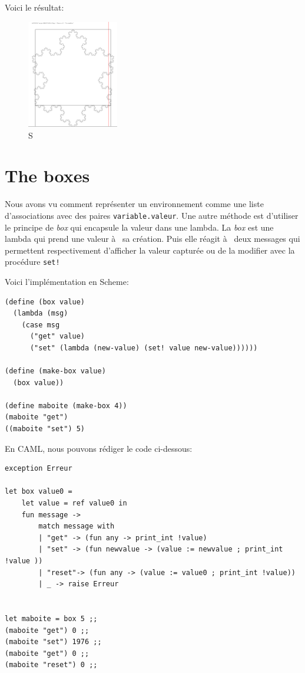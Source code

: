 \documentclass[11pt]{book}
\newcommand{\snow}{{\lettersnow S\hspace{0.2cm}}}
\begin{document}
Voici le résultat:
\begin{figure}[H]
	\centering
	\caption{\snow}
	\includegraphics[width=4.0cm]{snow.png}
\end{figure}

\section{The boxes}
Nous avons vu comment représenter un environnement comme une liste
d'associations avec des paires \verb+variable.valeur+.
Une autre méthode est d'utiliser le principe de \textit{box} qui encapsule la
valeur dans une lambda. La \textit{box} est une lambda qui prend une valeur à  sa
création. Puis elle réagit à  deux messages qui permettent respectivement
d'afficher la valeur capturée ou de la modifier avec la procédure \verb+set!+


Voici l'implémentation en Scheme:
\begin{Verbatim}
(define (box value)
  (lambda (msg)
    (case msg
      ("get" value)
      ("set" (lambda (new-value) (set! value new-value))))))

(define (make-box value)
  (box value))

(define maboite (make-box 4))
(maboite "get")
((maboite "set") 5)
\end{Verbatim}

En CAML, nous pouvons rédiger le code ci-dessous:
\begin{Verbatim}
exception Erreur

let box value0 =
	let value = ref value0 in
	fun message ->
		match message with
		| "get" -> (fun any -> print_int !value)
		| "set" -> (fun newvalue -> (value := newvalue ; print_int !value ))
		| "reset"-> (fun any -> (value := value0 ; print_int !value))
		| _ -> raise Erreur
		
		
let maboite = box 5 ;;
(maboite "get") 0 ;;
(maboite "set") 1976 ;;
(maboite "get") 0 ;;
(maboite "reset") 0 ;;
\end{Verbatim}
\end{document}
